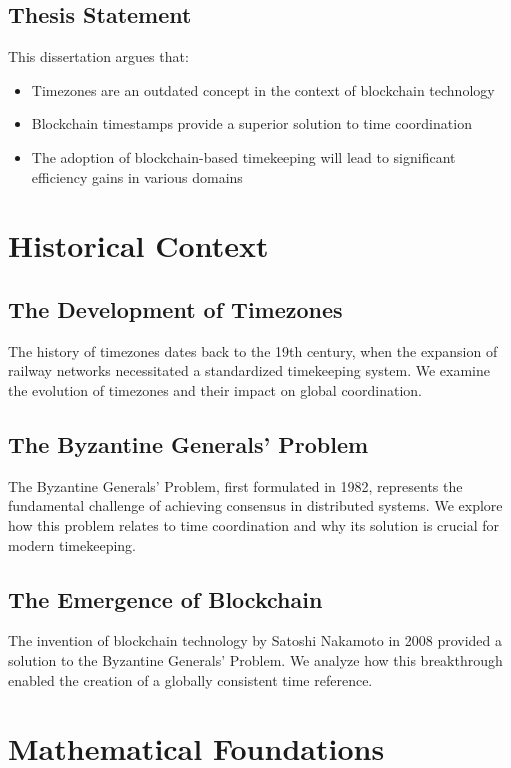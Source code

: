 \documentclass[12pt]{report}
\begin{document}
\section{Thesis Statement}
This dissertation argues that:
\begin{itemize}
    \item Timezones are an outdated concept in the context of blockchain technology
    \item Blockchain timestamps provide a superior solution to time coordination
    \item The adoption of blockchain-based timekeeping will lead to significant efficiency gains in various domains
\end{itemize}

\chapter{Historical Context}

\section{The Development of Timezones}
The history of timezones dates back to the 19th century, when the expansion of railway networks necessitated a standardized timekeeping system. We examine the evolution of timezones and their impact on global coordination.

\section{The Byzantine Generals' Problem}
The Byzantine Generals' Problem, first formulated in 1982, represents the fundamental challenge of achieving consensus in distributed systems. We explore how this problem relates to time coordination and why its solution is crucial for modern timekeeping.

\section{The Emergence of Blockchain}
The invention of blockchain technology by Satoshi Nakamoto in 2008 provided a solution to the Byzantine Generals' Problem. We analyze how this breakthrough enabled the creation of a globally consistent time reference.

\chapter{Mathematical Foundations}
\end{document}
